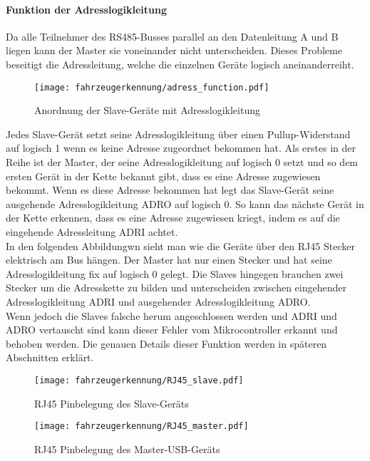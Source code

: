 \paragraph{Funktion der Adresslogikleitung}\label{sec:func_adress_wire}\mbox{}

Da alle Teilnehmer des RS485-Busses parallel an den Datenleitung A und B liegen kann der Master sie voneinander nicht unterscheiden. Dieses Probleme beseitigt die Adressleitung, welche
die einzelnen Geräte logisch aneinanderreiht.

\begin{figure}[H]
    \centering
    \texttt{[image: fahrzeugerkennung/adress\_function.pdf]}
    \caption{Anordnung der Slave-Geräte mit Adresslogikleitung}
\end{figure}

Jedes Slave-Gerät setzt seine Adresslogikleitung über einen Pullup-Widerstand auf logisch 1 wenn es keine Adresse zugeordnet bekommen hat.
Als erstes in der Reihe ist der Master, der seine Adresslogikleitung auf logisch 0 setzt und so dem ersten Gerät in der Kette bekannt gibt, dass es eine Adresse zugewiesen bekommt. Wenn es
diese Adresse bekommen hat legt das Slave-Gerät seine ausgehende Adresslogikleitung ADRO auf logisch 0. So kann das nächste Gerät in der Kette erkennen, dass es eine Adresse zugewiesen kriegt, 
indem es auf die eingehende Adressleitung ADRI achtet.\\
In den folgenden Abbildungwn sieht man wie die Geräte über den RJ45 Stecker elektrisch am Bus hängen. Der Master hat nur einen Stecker und hat seine Adresslogikleitung fix auf logisch 0 gelegt.
Die Slaves hingegen brauchen zwei Stecker um die Adresskette zu bilden und unterscheiden zwischen eingehender Adresslogikleitung ADRI und ausgehender Adresslogikleitung ADRO. \\
Wenn jedoch die Slaves falsche herum angeschlossen werden und ADRI und ADRO vertauscht sind kann dieser Fehler vom Mikrocontroller erkannt und behoben werden. Die genauen Details dieser Funktion 
werden in späteren Abschnitten erklärt. 

\begin{figure}[H]
    \centering
    \texttt{[image: fahrzeugerkennung/RJ45\_slave.pdf]}
    \caption{RJ45 Pinbelegung des Slave-Geräts}
\end{figure}

\begin{figure}[H]
    \centering
    \texttt{[image: fahrzeugerkennung/RJ45\_master.pdf]}
    \caption{RJ45 Pinbelegung des Master-USB-Geräts}
\end{figure}

